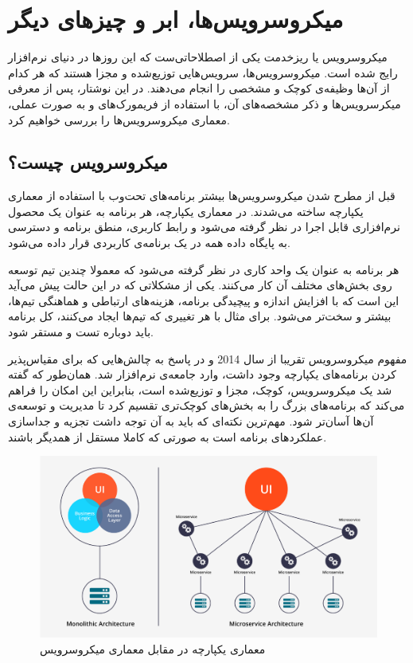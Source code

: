 \documentclass[a4paper,12pt]{book}
\begin{document}
	\chapter{میکروسرویس‌ها، ابر و چیزهای دیگر}
	
	میکروسرویس‌‌  یا ریزخدمت
	یکی از اصطلاحاتی‌ست که این روزها در دنیای نرم‌افزار رایج شده است. میکروسرویس‌‌ها، سرویس‌هایی توزیع‌شده و مجزا هستند که هر کدام از آن‌ها وظیفه‌ی کوچک و مشخصی را انجام می‌دهند. در این نوشتار، پس از معرفی میکرسرویس‌ها و ذکر  مشخصه‌های آن،‌ با استفاده از فریمورک‌های 
	و
	به صورت عملی، معماری میکروسرویس‌ها را بررسی خواهیم کرد.
	
	\section{میکروسرویس چیست؟}
	قبل از مطرح شدن میکروسرویس‌ها بیشتر برنامه‌های تحت‌وب با استفاده از معماری یکپارچه
	ساخته می‌شدند. در معماری یکپارچه، هر برنامه به عنوان یک محصول نرم‌افزاری قابل اجرا در نظر گرفته می‌شود و رابط کاربری، منطق برنامه و دسترسی به پایگاه داده همه در یک برنامه‌ی کاربردی قرار داده می‌شود. 
	
	هر برنامه به عنوان یک واحد کاری در نظر گرفته می‌شود که معمولا چندین تیم توسعه روی بخش‌های مختلف آن کار می‌کنند. یکی از مشکلاتی که در این حالت پیش می‌آید این است که با افزایش اندازه و پیچیدگی برنامه،‌ هزینه‌های ارتباطی و هماهنگی تیم‌ها، بیشتر و سخت‌تر می‌شود. برای مثال با هر تغییری که تیم‌ها ایجاد می‌کنند، کل برنامه  باید دوباره تست و مستقر شود. 
	
	مفهوم میکروسرویس تقریبا از سال 2014 و در پاسخ به چالش‌هایی که برای مقیاس‌پذیر کردن برنامه‌های یکپارچه وجود داشت، وارد جامعه‌ی نرم‌افزار شد. همان‌طور که گفته شد یک میکروسرویس، کوچک، مجزا و توزیع‌شده است، بنابراین این امکان را فراهم می‌کند که برنامه‌های بزرگ را به بخش‌های کوچک‌تری تقسیم کرد تا مدیریت و توسعه‌ی آن‌ها آسان‌تر شود. مهم‌ترین نکته‌ای که باید به آن توجه داشت تجزیه و جداسازی عملکردهای برنامه است به صورتی که کاملا مستقل از همدیگر باشند. 
	
	\begin{figure}[h]
		\centering
		\includegraphics[width=\textwidth]{1.png}
		\caption{ معماری یکپارچه در مقابل معماری میکروسرویس}
		\label{fig:1}
	\end{figure}
	
\end{document}
